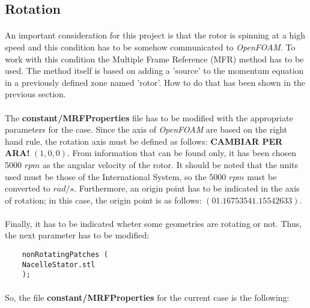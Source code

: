 \subsection{Rotation}
\paragraph{}An important consideration for this project is that the rotor is spinning at a high speed and this condition has to be somehow communicated to \textit{OpenFOAM}. To work with this condition the Multiple Frame Reference (MFR) method has to be used. The method itself is based on adding a 'source' to the momentum equation in a previously defined zone named 'rotor'. How to do that has been shown in the previous section.

\paragraph{}The \textbf{constant/MRFProperties} file has to be modified with the appropriate parameters for the case. Since the axis of \textit{OpenFOAM} are based on the right hand rule, the rotation axis must be defined as follows: \textbf{CAMBIAR PER ARA!} $(1,0,0)$. From information that can be found only, it has been chosen 5000 $rpm$ as the angular velocity of the rotor. It should be noted that the units used must be those of the International System, so the 5000 $rpm$ must be converted to $rad/s$. Furthermore, an origin point has to be indicated in the axis of rotation; in this case, the origin point is as follows: $(0 1.1675354 1.15542633)$. 

\paragraph{}Finally, it has to be indicated wheter some geometries are rotating or not. Thus, the next parameter has to be modified:

\begin{footnotesize}
\begin{verbatim}
    nonRotatingPatches (
	NacelleStator.stl
	);
\end{verbatim}
\end{footnotesize}

\paragraph{}So, the file \textbf{constant/MRFProperties} for the current case is the following:

